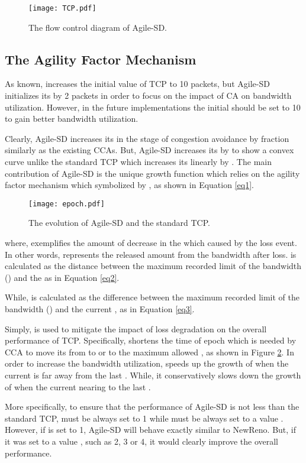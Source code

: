 \documentclass[preprint,3p,times,twocolumn,authoryear]{elsarticle}
\begin{document}
\begin{figure}[h!]
\centering
\texttt{[image: TCP.pdf]}
\caption{The flow control diagram of Agile-SD.}
\label{fig:TCP}
\end{figure}

\subsection{The Agility Factor Mechanism}
As known, \citet{RFC6928} increases the initial value of TCP  to 10 packets, but Agile-SD initializes its  by 2 packets in order to focus on the impact of CA on bandwidth utilization. However, in the future implementations the initial  should be set to 10 to gain better bandwidth utilization.

Clearly, Agile-SD increases its  in the stage of congestion avoidance by fraction similarly as the existing CCAs. But, Agile-SD increases its  by  to show a convex curve unlike the standard TCP which increases its  linearly by . The main contribution of Agile-SD is the unique  growth function which relies on the agility factor mechanism which symbolized by , as shown in Equation \eqref{eq1}.
\begin{figure}[t]
\centering
\texttt{[image: epoch.pdf]}
\caption{The  evolution of Agile-SD and the standard TCP.}
\label{fig:epoch}
\end{figure}

where,  exemplifies the amount of decrease in the  which caused by the loss event. In other words,  represents the released amount from the bandwidth after loss.  is calculated as the distance between the maximum recorded limit of the bandwidth () and the  as in Equation \eqref{eq2}.


While,  is calculated as the difference between the maximum recorded limit of the bandwidth () and the current , as in Equation \eqref{eq3}.


Simply,  is used to mitigate the impact of loss degradation on the overall performance of TCP. Specifically,  shortens the time of epoch which is needed by CCA to move its  from  to  or to the maximum allowed , as shown in Figure \ref{fig:epoch}. In order to increase the bandwidth utilization,  speeds up the growth of  when the current  is far away from the last . While, it conservatively slows down the growth of  when the current  nearing to the last .

More specifically, to ensure that the performance of Agile-SD is not less than the standard TCP,  must be always set to 1 while  must be always set to a value . However, if  is set to 1, Agile-SD will behave exactly similar to NewReno. But, if it was set to a value , such as 2, 3 or 4, it would clearly improve the overall performance. 
\end{document}
